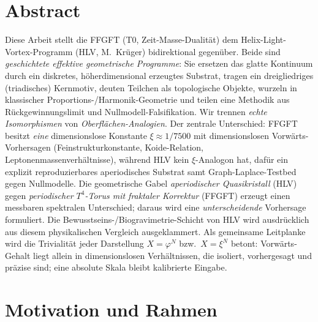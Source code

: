 
\section*{Abstract}
Diese Arbeit stellt die FFGFT (T0, Zeit-Masse-Dualität) dem Helix-Light-Vortex-Programm
(HLV, M.~Krüger) bidirektional gegenüber. Beide sind \emph{geschichtete effektive
geometrische Programme}: Sie ersetzen das glatte Kontinuum durch ein diskretes,
höherdimensional erzeugtes Substrat, tragen ein dreigliedriges (triadisches) Kernmotiv,
deuten Teilchen als topologische Objekte, wurzeln in klassischer Proportions-/Harmonik-Geometrie
und teilen eine Methodik aus Rückgewinnungslimit und Nullmodell-Falsifikation. Wir trennen
\emph{echte Isomorphismen} von \emph{Oberflächen-Analogien}. Der zentrale Unterschied:
FFGFT besitzt \emph{eine} dimensionslose Konstante $\xi \approx 1/7500$ mit dimensionslosen
Vorwärts-Vorhersagen (Feinstrukturkonstante, Koide-Relation, Leptonenmassenverhältnisse),
während HLV kein $\xi$-Analogon hat, dafür ein explizit reproduzierbares aperiodisches
Substrat samt Graph-Laplace-Testbed gegen Nullmodelle. Die geometrische Gabel
\emph{aperiodischer Quasikristall} (HLV) gegen \emph{periodischer $T^4$-Torus mit fraktaler
Korrektur} (FFGFT) erzeugt einen messbaren spektralen Unterschied; daraus wird eine
\emph{unterscheidende} Vorhersage formuliert. Die Bewusstseins-/Biogravimetrie-Schicht von
HLV wird ausdrücklich aus diesem physikalischen Vergleich ausgeklammert. Als gemeinsame
Leitplanke wird die Trivialität jeder Darstellung $X=\varphi^{N}$ bzw.\ $X=\xi^{N}$
betont: Vorwärts-Gehalt liegt allein in dimensionslosen Verhältnissen, die isoliert,
vorhergesagt und präzise sind; eine absolute Skala bleibt kalibrierte Eingabe.

\section{Motivation und Rahmen}

